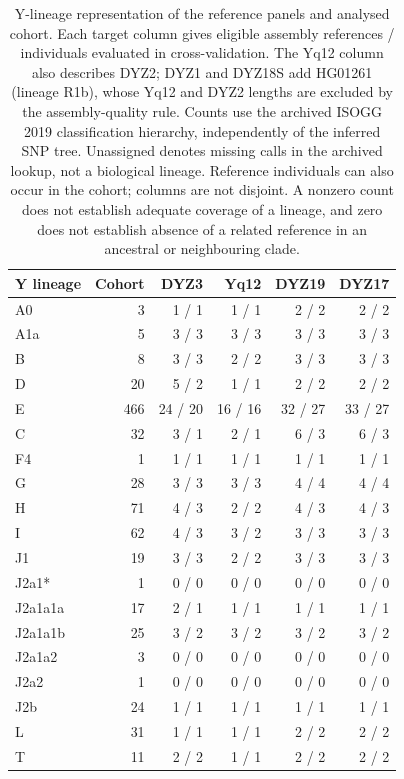 \begin{table}[p]
\caption{Y-lineage representation of the reference panels and analysed cohort. Each target column gives eligible assembly references / individuals evaluated in cross-validation. The Yq12 column also describes DYZ2; DYZ1 and DYZ18S add HG01261 (lineage R1b), whose Yq12 and DYZ2 lengths are excluded by the assembly-quality rule. Counts use the archived ISOGG 2019 classification hierarchy, independently of the inferred SNP tree. Unassigned denotes missing calls in the archived lookup, not a biological lineage. Reference individuals can also occur in the cohort; columns are not disjoint. A nonzero count does not establish adequate coverage of a lineage, and zero does not establish absence of a related reference in an ancestral or neighbouring clade.}\label{tab:reference-lineages}
\centering\small
\begin{tabular}{lrrrrr}
\toprule
Y lineage & Cohort & DYZ3 & Yq12 & DYZ19 & DYZ17 \\
\midrule
A0 & 3 & 1 / 1 & 1 / 1 & 2 / 2 & 2 / 2 \\
A1a & 5 & 3 / 3 & 3 / 3 & 3 / 3 & 3 / 3 \\
B & 8 & 3 / 3 & 2 / 2 & 3 / 3 & 3 / 3 \\
D & 20 & 5 / 2 & 1 / 1 & 2 / 2 & 2 / 2 \\
E & 466 & 24 / 20 & 16 / 16 & 32 / 27 & 33 / 27 \\
C & 32 & 3 / 1 & 2 / 1 & 6 / 3 & 6 / 3 \\
F4 & 1 & 1 / 1 & 1 / 1 & 1 / 1 & 1 / 1 \\
G & 28 & 3 / 3 & 3 / 3 & 4 / 4 & 4 / 4 \\
H & 71 & 4 / 3 & 2 / 2 & 4 / 3 & 4 / 3 \\
I & 62 & 4 / 3 & 3 / 2 & 3 / 3 & 3 / 3 \\
J1 & 19 & 3 / 3 & 2 / 2 & 3 / 3 & 3 / 3 \\
J2a1* & 1 & 0 / 0 & 0 / 0 & 0 / 0 & 0 / 0 \\
J2a1a1a & 17 & 2 / 1 & 1 / 1 & 1 / 1 & 1 / 1 \\
J2a1a1b & 25 & 3 / 2 & 3 / 2 & 3 / 2 & 3 / 2 \\
J2a1a2 & 3 & 0 / 0 & 0 / 0 & 0 / 0 & 0 / 0 \\
J2a2 & 1 & 0 / 0 & 0 / 0 & 0 / 0 & 0 / 0 \\
J2b & 24 & 1 / 1 & 1 / 1 & 1 / 1 & 1 / 1 \\
L & 31 & 1 / 1 & 1 / 1 & 2 / 2 & 2 / 2 \\
T & 11 & 2 / 2 & 1 / 1 & 2 / 2 & 2 / 2 \\

\end{tabular}
\end{table}
